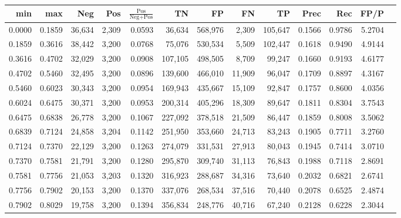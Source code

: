 \begin{tabular}{rrrrrrrrrrrrr}
\toprule
   min &    max &    Neg &   Pos & $\frac{\text{Pos}}{\text{Neg}+\text{Pos}}$ &      TN &      FP &      FN &      TP &   Prec &    Rec &   FP/P \\
\midrule
0.0000 & 0.1859 & 36,634 & 2,309 &                                     0.0593 &  36,634 & 568,976 &   2,309 & 105,647 & 0.1566 & 0.9786 & 5.2704 \\
0.1859 & 0.3616 & 38,442 & 3,200 &                                     0.0768 &  75,076 & 530,534 &   5,509 & 102,447 & 0.1618 & 0.9490 & 4.9144 \\
0.3616 & 0.4702 & 32,029 & 3,200 &                                     0.0908 & 107,105 & 498,505 &   8,709 &  99,247 & 0.1660 & 0.9193 & 4.6177 \\
0.4702 & 0.5460 & 32,495 & 3,200 &                                     0.0896 & 139,600 & 466,010 &  11,909 &  96,047 & 0.1709 & 0.8897 & 4.3167 \\
0.5460 & 0.6023 & 30,343 & 3,200 &                                     0.0954 & 169,943 & 435,667 &  15,109 &  92,847 & 0.1757 & 0.8600 & 4.0356 \\
0.6024 & 0.6475 & 30,371 & 3,200 &                                     0.0953 & 200,314 & 405,296 &  18,309 &  89,647 & 0.1811 & 0.8304 & 3.7543 \\
0.6475 & 0.6838 & 26,778 & 3,200 &                                     0.1067 & 227,092 & 378,518 &  21,509 &  86,447 & 0.1859 & 0.8008 & 3.5062 \\
0.6839 & 0.7124 & 24,858 & 3,204 &                                     0.1142 & 251,950 & 353,660 &  24,713 &  83,243 & 0.1905 & 0.7711 & 3.2760 \\
0.7124 & 0.7370 & 22,129 & 3,200 &                                     0.1263 & 274,079 & 331,531 &  27,913 &  80,043 & 0.1945 & 0.7414 & 3.0710 \\
0.7370 & 0.7581 & 21,791 & 3,200 &                                     0.1280 & 295,870 & 309,740 &  31,113 &  76,843 & 0.1988 & 0.7118 & 2.8691 \\
0.7581 & 0.7756 & 21,053 & 3,203 &                                     0.1320 & 316,923 & 288,687 &  34,316 &  73,640 & 0.2032 & 0.6821 & 2.6741 \\
0.7756 & 0.7902 & 20,153 & 3,200 &                                     0.1370 & 337,076 & 268,534 &  37,516 &  70,440 & 0.2078 & 0.6525 & 2.4874 \\
0.7902 & 0.8029 & 19,758 & 3,200 &                                     0.1394 & 356,834 & 248,776 &  40,716 &  67,240 & 0.2128 & 0.6228 & 2.3044 \\

\end{tabular}
